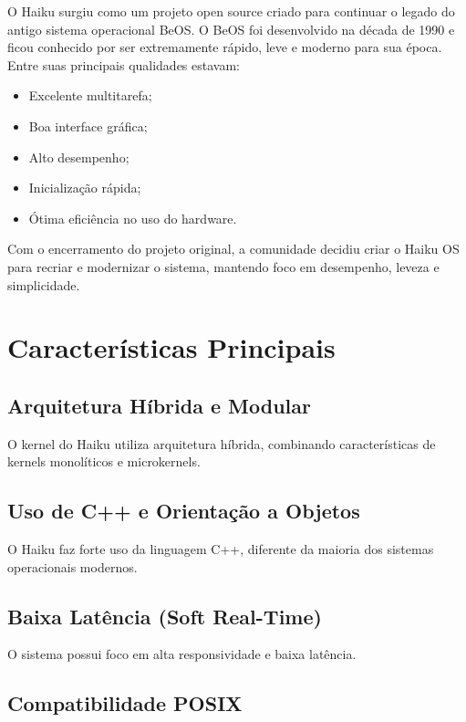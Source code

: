 \documentclass[12pt,a4paper]{article}
\begin{document}
O Haiku surgiu como um projeto open source criado para continuar o legado do antigo sistema operacional BeOS.
O BeOS foi desenvolvido na década de 1990 e ficou conhecido por ser extremamente rápido, leve e moderno para sua época.
Entre suas principais qualidades estavam:

\begin{itemize}
    \item Excelente multitarefa;
    \item Boa interface gráfica;
    \item Alto desempenho;
    \item Inicialização rápida;
    \item Ótima eficiência no uso do hardware.
\end{itemize}

Com o encerramento do projeto original, a comunidade decidiu criar o Haiku OS para recriar e modernizar o sistema, mantendo foco em desempenho, leveza e simplicidade.


\section{Características Principais}

\subsection{Arquitetura Híbrida e Modular}

O kernel do Haiku utiliza arquitetura híbrida, combinando características de kernels monolíticos e microkernels.

\subsection{Uso de C++ e Orientação a Objetos}

O Haiku faz forte uso da linguagem C++, diferente da maioria dos sistemas operacionais modernos.

\subsection{Baixa Latência (Soft Real-Time)}

O sistema possui foco em alta responsividade e baixa latência.

\subsection{Compatibilidade POSIX}
\end{document}

